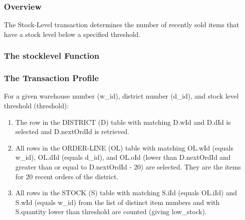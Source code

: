\subsubsection {Overview}

The Stock-Level transaction determines the number of recently sold items that have a stock level below a specified threshold.

\subsubsection{The stocklevel Function}



\subsubsection{The Transaction Profile}

For a given warehouse number (w\_id), district number (d\_id), and stock level threshold (threshold):

\begin{enumerate}
    \item The row in the DISTRICT (D) table with matching D.wId and D.dId is selected and D.nextOrdId is retrieved.
    
    \item All rows in the ORDER-LINE (OL) table with matching OL.wId (equals w\_id), OL.dId (equals d\_id), and OL.oId (lower than D.nextOrdId and greater than or equal to D.nextOrdId - 20) are selected. They are the items for 20 recent orders of the district.
    
    \item All rows in the STOCK (S) table with matching S.iId (equals OL.iId) and S.wId (equals w\_id) from the list of distinct item numbers and with S.quantity lower than threshold are counted (giving low\_stock).
\end{enumerate}